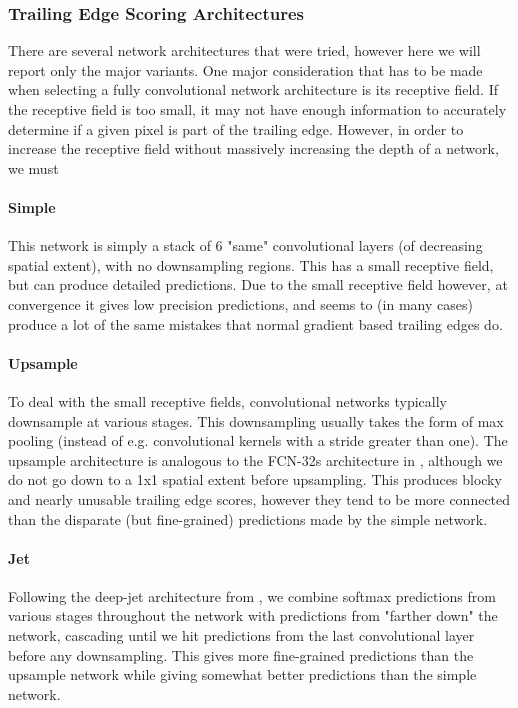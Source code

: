 \subsubsection{Trailing Edge Scoring Architectures}

There are several network architectures that were tried, however here we will report only the major variants.
One major consideration that has to be made when selecting a fully convolutional network architecture is its receptive field.
If the receptive field is too small, it may not have enough information to accurately determine if a given pixel is part of the trailing edge.
However, in order to increase the receptive field without massively increasing the depth of a network, we must 

\paragraph{Simple}
This network is simply a stack of $6$ "same" convolutional layers (of decreasing spatial extent), with no downsampling regions.
This has a small receptive field, but can produce detailed predictions.
Due to the small receptive field however, at convergence it gives low precision predictions, and seems to (in many cases) produce a lot of the same mistakes that normal gradient based trailing edges do.

\paragraph{Upsample}
To deal with the small receptive fields, convolutional networks typically downsample at various stages. 
This downsampling usually takes the form of max pooling (instead of e.g. convolutional kernels with a stride greater than one).
The upsample architecture is analogous to the FCN-32s architecture in \cite{long2015fully}, although we do not go down to a 1x1 spatial extent before upsampling.
This produces blocky and nearly unusable trailing edge scores, however they tend to be more connected than the disparate (but fine-grained) predictions made by the simple network.


\paragraph{Jet}
Following the deep-jet architecture from \cite{long2015fully}, we combine softmax predictions from various stages throughout the network with predictions from "farther down" the network, cascading until we hit predictions from the last convolutional layer before any downsampling.
This gives more fine-grained predictions than the upsample network while giving somewhat better predictions than the simple network.

